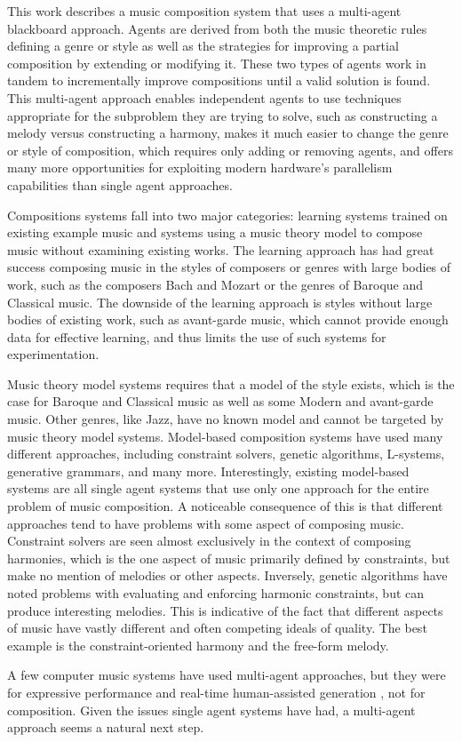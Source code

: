 This work describes a music composition system that uses a multi-agent blackboard approach.
Agents are derived from both the music theoretic rules defining a genre or style as well as the strategies for improving a partial composition by extending or modifying it.
These two types of agents work in tandem to incrementally improve compositions until a valid solution is found.
This multi-agent approach enables independent agents to use techniques appropriate for the subproblem they are trying to solve, such as constructing a melody versus constructing a harmony,
makes it much easier to change the genre or style of composition, which requires only adding or removing agents,
and offers many more opportunities for exploiting modern hardware's parallelism capabilities than single agent approaches.

Compositions systems fall into two major categories: learning systems trained on existing example music and systems using a music theory model to compose music without examining existing works.
The learning approach has had great success composing music in the styles of composers or genres with large bodies of work, such as the composers Bach and Mozart or the genres of Baroque and Classical music.
\cite{Cope2004,Edwards2011,Papadopoulos1999}
The downside of the learning approach is styles without large bodies of existing work, such as avant-garde music, 
which cannot provide enough data for effective learning, and thus limits the use of such systems for experimentation.

Music theory model systems requires that a model of the style exists, which is the case for Baroque and Classical music as well as some Modern and avant-garde music.
Other genres, like Jazz, have no known model and cannot be targeted by music theory model systems.
Model-based composition systems have used many different approaches, including constraint solvers, genetic algorithms, L-systems, generative grammars, and many more.
\cite{Anders2010, Burton1999, Edwards2011, Pachet, Papadopoulos1999, Sandred2010}
Interestingly, existing model-based systems are all single agent systems that use only one approach for the entire problem of music composition.
A noticeable consequence of this is that different approaches tend to have problems with some aspect of composing music.
Constraint solvers are seen almost exclusively in the context of composing harmonies, which is the one aspect of music primarily defined by constraints, but make no mention of melodies or other aspects.
\cite{Anders2010, Pachet, Sandred2010}
Inversely, genetic algorithms have noted problems with evaluating and enforcing harmonic constraints, but can produce interesting melodies.
\cite{Burton1999}
This is indicative of the fact that different aspects of music have vastly different and often competing ideals of quality.
The best example is the constraint-oriented harmony and the free-form melody.

A few computer music systems have used multi-agent approaches, but they were for expressive performance \cite{Miranda2010} and real-time human-assisted generation \cite{Eigenfeldt2009}, not for composition.
Given the issues single agent systems have had, a multi-agent approach seems a natural next step.
